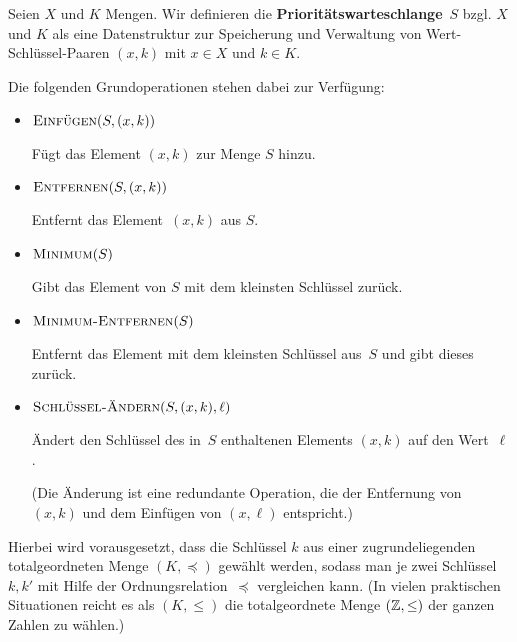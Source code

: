 \begin{defn}
	Seien $X$ und $K$ Mengen. 
	Wir definieren die \textbf{Prioritätswarteschlange}~$S$ bzgl. $X$ und $K$ als eine Datenstruktur zur Speicherung und Verwaltung von Wert-Schlüssel-Paaren $(x,k)$ mit $x \in X$ und $k \in K$.
	 
	 Die folgenden Grundoperationen stehen dabei zur Verfügung: 
%
\begin{itemize}
 \item $\mathop{\text{\textsc{Einf\"ugen}}}(S,(x,k))$
 
 Fügt das Element $(x,k)$ zur Menge $S$ hinzu.

 \item $\mathop{\text{\textsc{Entfernen}}}(S,(x,k))$
 
 Entfernt das Element~$(x,k)$ aus $S$.

 \item $\mathop{\text{\textsc{Minimum}}}(S)$
 
 Gibt das Element von $S$ mit dem kleinsten Schlüssel zurück.
 
 \item $\mathop{\text{\textsc{Minimum-Entfernen}}}(S)$
 
 Entfernt das Element mit dem kleinsten Schlüssel aus~$S$ und gibt dieses zurück.

 \item $\mathop{\text{\textsc{Schl\"u{\ss}el-\"Andern}}}(S,(x,k),\ell)$
 
 Ändert den Schlüssel des in~$S$ enthaltenen Elements $(x,k)$ auf den Wert~$\ell$.
 
 (Die Änderung ist eine redundante Operation, die der Entfernung von $(x,k)$ und dem Einfügen von $(x,\ell)$ entspricht.) 
\end{itemize}

%
\noindent Hierbei wird vorausgesetzt, dass die Schlüssel $k$ aus einer zugrundeliegenden totalgeordneten Menge $(K,\preceq)$ gewählt werden, sodass man je zwei Schlüssel $k,k'$ mit Hilfe der Ordnungsrelation~$\preceq$ vergleichen kann. (In vielen praktischen Situationen reicht es als $(K,\le)$ die totalgeordnete Menge $(\mathbb{Z},\le)$ der ganzen Zahlen zu wählen.)
\end{defn} 


